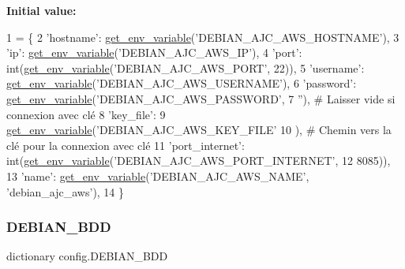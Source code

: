 {\bfseries Initial value\+:}
\begin{DoxyCode}
1 =  \{
2     \textcolor{stringliteral}{'hostname'}: \hyperlink{namespaceconfig_a7cf1bd9315cd5f3237441a2d9414082d}{get\_env\_variable}(\textcolor{stringliteral}{'DEBIAN\_AJC\_AWS\_HOSTNAME'}),
3     \textcolor{stringliteral}{'ip'}: \hyperlink{namespaceconfig_a7cf1bd9315cd5f3237441a2d9414082d}{get\_env\_variable}(\textcolor{stringliteral}{'DEBIAN\_AJC\_AWS\_IP'}),
4     \textcolor{stringliteral}{'port'}: int(\hyperlink{namespaceconfig_a7cf1bd9315cd5f3237441a2d9414082d}{get\_env\_variable}(\textcolor{stringliteral}{'DEBIAN\_AJC\_AWS\_PORT'}, 22)),
5     \textcolor{stringliteral}{'username'}: \hyperlink{namespaceconfig_a7cf1bd9315cd5f3237441a2d9414082d}{get\_env\_variable}(\textcolor{stringliteral}{'DEBIAN\_AJC\_AWS\_USERNAME'}),
6     \textcolor{stringliteral}{'password'}: \hyperlink{namespaceconfig_a7cf1bd9315cd5f3237441a2d9414082d}{get\_env\_variable}(\textcolor{stringliteral}{'DEBIAN\_AJC\_AWS\_PASSWORD'},
7                                  \textcolor{stringliteral}{''}),  \textcolor{comment}{# Laisser vide si connexion avec clé}
8     \textcolor{stringliteral}{'key\_file'}:
9     \hyperlink{namespaceconfig_a7cf1bd9315cd5f3237441a2d9414082d}{get\_env\_variable}(\textcolor{stringliteral}{'DEBIAN\_AJC\_AWS\_KEY\_FILE'}
10                      ),  \textcolor{comment}{# Chemin vers la clé pour la connexion avec clé}
11     \textcolor{stringliteral}{'port\_internet'}: int(\hyperlink{namespaceconfig_a7cf1bd9315cd5f3237441a2d9414082d}{get\_env\_variable}(\textcolor{stringliteral}{'DEBIAN\_AJC\_AWS\_PORT\_INTERNET'},
12                                           8085)),
13     \textcolor{stringliteral}{'name'}: \hyperlink{namespaceconfig_a7cf1bd9315cd5f3237441a2d9414082d}{get\_env\_variable}(\textcolor{stringliteral}{'DEBIAN\_AJC\_AWS\_NAME'}, \textcolor{stringliteral}{'debian\_ajc\_aws'}),
14 \}
\end{DoxyCode}
\mbox{\label{namespaceconfig_a71816e4f95571e210c3a11901501efe1}} 
\subsubsection{\texorpdfstring{D\+E\+B\+I\+A\+N\+\_\+\+B\+DD}{DEBIAN\_BDD}}
{\footnotesize\ttfamily dictionary config.\+D\+E\+B\+I\+A\+N\+\_\+\+B\+DD}

